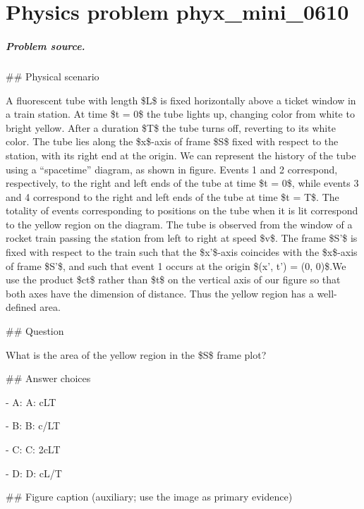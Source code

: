 
\chapter{Physics problem phyx\_mini\_0610}
\label{ch:PhyXMiniProblems_problem_phyx_mini_0610}

\paragraph{Problem source.}
\#\# Physical scenario

A fluorescent tube with length \$L\$ is fixed horizontally above a ticket window in a train station. At time \$t = 0\$ the tube lights up, changing color from white to bright yellow. After a duration \$T\$ the tube turns off, reverting to its white color. The tube lies along the \$x\$-axis of frame \$S\$ fixed with respect to the station, with its right end at the origin. We can represent the history of the tube using a “spacetime” diagram, as shown in figure. Events 1 and 2 correspond, respectively, to the right and left ends of the tube at time \$t = 0\$, while events 3 and 4 correspond to the right and left ends of the tube at time \$t = T\$. The totality of events corresponding to positions on the tube when it is lit correspond to the yellow region on the diagram. The tube is observed from the window of a rocket train passing the station from left to right at speed \$v\$. The frame \$S'\$ is fixed with respect to the train such that the \$x'\$-axis coincides with the \$x\$-axis of frame \$S'\$, and such that event 1 occurs at the origin \$(x', t') = (0, 0)\$.We use the product \$ct\$ rather than \$t\$ on the vertical axis of our figure so that both axes have the dimension of distance. Thus the yellow region has a well-defined area.

\#\# Question

What is the area of the yellow region in the \$S\$ frame plot?

\#\# Answer choices

- A: A: cLT

- B: B: c/LT

- C: C: 2cLT

- D: D: cL/T

\#\# Figure caption (auxiliary; use the image as primary evidence)

